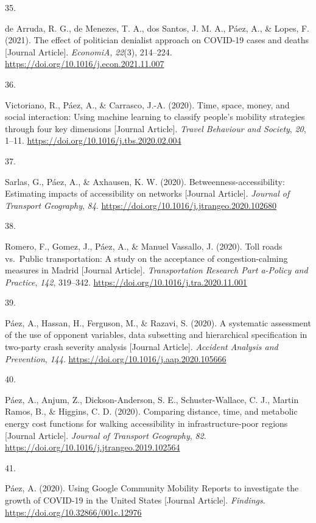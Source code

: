 \documentclass[11pt,a4paper,]{awesome-cv}
\newlength{\cslhangindent}
\newlength{\csllabelwidth}
\newenvironment{CSLReferences}[2] %
 {\begin{list}{}{%
  \setlength{\itemindent}{0pt}
  \setlength{\leftmargin}{0pt}
  \setlength{\parsep}{0pt}
  \ifodd #1
   \setlength{\leftmargin}{\cslhangindent}
   \setlength{\itemindent}{-1\cslhangindent}
  \fi
  \setlength{\itemsep}{#2\baselineskip}}}
 {\end{list}}
\newcommand{\CSLLeftMargin}[1]{\parbox[t]{\csllabelwidth}{\strut#1\strut}}
\newcommand{\CSLRightInline}[1]{\parbox[t]{\linewidth - \csllabelwidth}{\strut#1\strut}}
\begin{document}
\begin{CSLReferences}{0}{0}
\CSLLeftMargin{35. }%
\CSLRightInline{de Arruda, R. G., de Menezes, T. A., dos Santos, J. M.
A., Páez, A., \& Lopes, F. (2021). The effect of politician denialist
approach on COVID-19 cases and deaths {[}Journal Article{]}.
\emph{EconomiA}, \emph{22}(3), 214--224.
\url{https://doi.org/10.1016/j.econ.2021.11.007}}

\CSLLeftMargin{36. }%
\CSLRightInline{Victoriano, R., Páez, A., \& Carrasco, J.-A. (2020).
Time, space, money, and social interaction: Using machine learning to
classify people's mobility strategies through four key dimensions
{[}Journal Article{]}. \emph{Travel Behaviour and Society}, \emph{20},
1--11. \url{https://doi.org/10.1016/j.tbs.2020.02.004}}

\CSLLeftMargin{37. }%
\CSLRightInline{Sarlas, G., Páez, A., \& Axhausen, K. W. (2020).
Betweenness-accessibility: Estimating impacts of accessibility on
networks {[}Journal Article{]}. \emph{Journal of Transport Geography},
\emph{84}. \url{https://doi.org/10.1016/j.jtrangeo.2020.102680}}

\CSLLeftMargin{38. }%
\CSLRightInline{Romero, F., Gomez, J., Páez, A., \& Manuel Vassallo, J.
(2020). Toll roads vs.~Public transportation: A study on the acceptance
of congestion-calming measures in Madrid {[}Journal Article{]}.
\emph{Transportation Research Part a-Policy and Practice}, \emph{142},
319--342. \url{https://doi.org/10.1016/j.tra.2020.11.001}}

\CSLLeftMargin{39. }%
\CSLRightInline{Páez, A., Hassan, H., Ferguson, M., \& Razavi, S.
(2020). A systematic assessment of the use of opponent variables, data
subsetting and hierarchical specification in two-party crash severity
analysis {[}Journal Article{]}. \emph{Accident Analysis and Prevention},
\emph{144}. \url{https://doi.org/10.1016/j.aap.2020.105666}}

\CSLLeftMargin{40. }%
\CSLRightInline{Páez, A., Anjum, Z., Dickson-Anderson, S. E.,
Schuster-Wallace, C. J., Martin Ramos, B., \& Higgins, C. D. (2020).
Comparing distance, time, and metabolic energy cost functions for
walking accessibility in infrastructure-poor regions {[}Journal
Article{]}. \emph{Journal of Transport Geography}, \emph{82}.
\url{https://doi.org/10.1016/j.jtrangeo.2019.102564}}

\CSLLeftMargin{41. }%
\CSLRightInline{Páez, A. (2020). Using Google Community Mobility Reports
to investigate the growth of COVID-19 in the United States {[}Journal
Article{]}. \emph{Findings}. \url{https://doi.org/10.32866/001c.12976}}


\end{CSLReferences}
\end{document}
